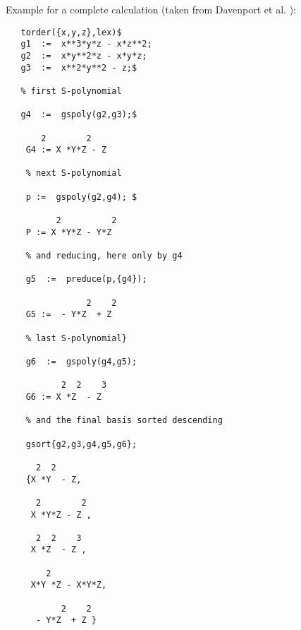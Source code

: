 Example for a complete calculation (taken from {\sc Davenport et al.}
 \cite{Davenport:88a}):
\begin{verbatim}
   torder({x,y,z},lex)$
   g1  :=  x**3*y*z - x*z**2;
   g2  :=  x*y**2*z - x*y*z;
   g3  :=  x**2*y**2 - z;$

   % first S-polynomial

   g4  :=  gspoly(g2,g3);$

       2        2
    G4 := X *Y*Z - Z

    % next S-polynomial

    p :=  gspoly(g2,g4); $

          2          2
    P := X *Y*Z - Y*Z

    % and reducing, here only by g4

    g5  :=  preduce(p,{g4});

                2    2
    G5 :=  - Y*Z  + Z

    % last S-polynomial}

    g6  :=  gspoly(g4,g5);

           2  2    3
    G6 := X *Z  - Z

    % and the final basis sorted descending

    gsort{g2,g3,g4,g5,g6};

      2  2
    {X *Y  - Z,

      2        2
     X *Y*Z - Z ,

      2  2    3
     X *Z  - Z ,

        2
     X*Y *Z - X*Y*Z,

           2    2
      - Y*Z  + Z }
 \end{verbatim}





